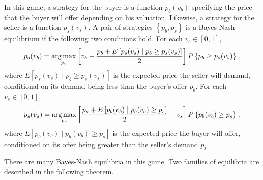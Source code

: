 In this game, a strategy for the buyer is a function $p_b(v_b)$ specifying the price that the buyer will offer depending on his valuation. Likewise, a strategy for the seller is a function $p_s(v_s)$. A pair of strategies $\left\{p_b,p_s\right\}$ is a Bayes-Nash equilibrium if the following two conditions hold. For each $v_b \in [0,1]$,
\begin{align}
 p_b(v_b) = \operatorname*{arg\,max}_{p_b} \left[v_b - \frac{p_b + E\left[p_s(v_s) \mid p_b \geq p_s(v_s)\right]}{2}\right] P \left\{p_b \geq p_s(v_s) \right\}\label{eq:auc:buyer}\,,
\end{align}
where $E\left[p_s(v_s) \mid p_b \geq p_s(v_s)\right]$ is the expected price the seller will demand, conditional on its demand being less than the buyer's offer $p_b$. For each $v_s \in [0,1]$,
\begin{align}
p_s(v_s) = \operatorname*{arg\,max}_{p_s} \left[ \frac{p_s + E\left[p_b(v_b) \mid p_b(v_b) \geq p_s\right]}{2} - v_s \right] P \left\{ p_b(v_b) \geq p_s \right\}\,, \label{eq:auc:seller}
\end{align}
where $E\left[p_b(v_b) \mid p_b(v_b) \geq p_s\right]$ is the expected price the buyer will offer, conditioned on its offer being greater than the seller's demand $p_s$.

There are many Bayes-Nash equilibria in this game. Two families of equilibria are described in the following theorem.

